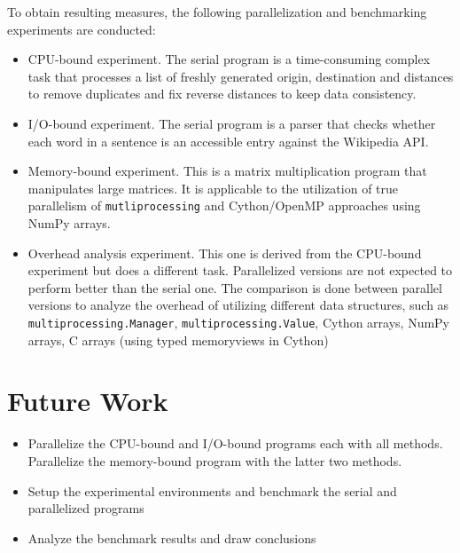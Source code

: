 \documentclass[letterpaper,twocolumn,10pt]{article}
\begin{document}
To obtain resulting measures, the following parallelization and benchmarking experiments are conducted:
\begin{itemize}
\setlength{\itemsep}{0em}
  \item CPU-bound experiment. The serial program is a time-consuming complex task that processes a list of freshly generated origin, destination and distances to remove duplicates and fix reverse distances to keep data consistency.
  \item I/O-bound experiment. The serial program is a parser that checks whether each word in a sentence is an accessible entry against the Wikipedia API.
  \item Memory-bound experiment. This is a matrix multiplication program that manipulates large matrices. It is applicable to the utilization of true parallelism of \verb#mutliprocessing# and Cython/OpenMP approaches using NumPy arrays.
  \item Overhead analysis experiment. This one is derived from the CPU-bound experiment but does a different task. Parallelized versions are not expected to perform better than the serial one. The comparison is done between parallel versions to analyze the overhead of utilizing different data structures, such as \verb#multiprocessing.Manager#, \verb#multiprocessing.Value#, Cython arrays, NumPy arrays, C arrays (using typed memoryviews in Cython)
\end{itemize}

\section{Future Work}

\begin{itemize}
\setlength{\itemsep}{0em}
  \item Parallelize the CPU-bound and I/O-bound programs each with all methods. Parallelize the memory-bound program with the latter two methods. 
  \item Setup the experimental environments and benchmark the serial and parallelized programs
  \item Analyze the benchmark results and draw conclusions
\end{itemize}
\end{document}

